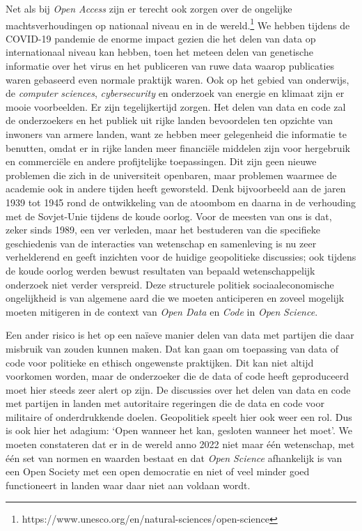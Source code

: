 \documentclass[smallauthor, chapterhaspagenum, nochapterinheader, pagenuminheader,  bigchapnum,medium2, tocpages,  garamond, titleinheader]{jote-book}
\begin{document}
	Net als bij \emph{Open Access} zijn er terecht ook zorgen over de ongelijke machtsverhoudingen op nationaal niveau en in de wereld.\footnote{https://www.unesco.org/en/natural-sciences/open-science} We hebben tijdens de COVID-19 pandemie de enorme impact gezien die het delen van data op internationaal niveau kan hebben, toen het meteen delen van genetische informatie over het virus en het publiceren van ruwe data waarop publicaties waren gebaseerd even normale praktijk waren. Ook op het gebied van onderwijs, de \emph{computer }\emph{sciences}, \emph{cybersecurity} en onderzoek van energie en klimaat zijn er mooie voorbeelden. Er zijn tegelijkertijd zorgen. Het delen van data en code zal de onderzoekers en het publiek uit rijke landen bevoordelen ten opzichte van inwoners van armere landen, want ze hebben meer gelegenheid die informatie te benutten, omdat er in rijke landen meer financiële middelen zijn voor hergebruik en commerciële en andere profijtelijke toepassingen. Dit zijn geen nieuwe problemen die zich in de universiteit openbaren, maar problemen waarmee de academie ook in andere tijden heeft geworsteld. Denk bijvoorbeeld aan de jaren 1939 tot 1945 rond de ontwikkeling van de atoombom en daarna in de verhouding met de Sovjet-Unie tijdens de koude oorlog. Voor de meesten van ons is dat, zeker sinds 1989, een ver verleden, maar het bestuderen van die specifieke geschiedenis van de interacties van wetenschap en samenleving is nu zeer verhelderend en geeft inzichten voor de huidige geopolitieke discussies; ook tijdens de koude oorlog werden bewust resultaten van bepaald wetenschappelijk onderzoek niet verder verspreid. Deze structurele politiek sociaaleconomische ongelijkheid is van algemene aard die we moeten anticiperen en zoveel mogelijk moeten mitigeren in de context van \emph{Open Data} en \emph{Code} in \emph{Open }\emph{Science}.



	Een ander risico is het op een naïeve manier delen van data met partijen die daar misbruik van zouden kunnen maken. Dat kan gaan om toepassing van data of code voor politieke en ethisch ongewenste praktijken. Dit kan niet altijd voorkomen worden, maar de onderzoeker die de data of code heeft geproduceerd moet hier steeds zeer alert op zijn. De discussies over het delen van data en code met partijen in landen met autoritaire regeringen die de data en code voor militaire of onderdrukkende doelen. Geopolitiek speelt hier ook weer een rol. Dus is ook hier het adagium: ‘Open wanneer het kan, gesloten wanneer het moet'. We moeten constateren dat er in de wereld anno 2022 niet maar één wetenschap, met één set van normen en waarden bestaat en dat \emph{Open }\emph{Science} afhankelijk is van een Open Society met een open democratie en niet of veel minder goed functioneert in landen waar daar niet aan voldaan wordt.
\end{document}
